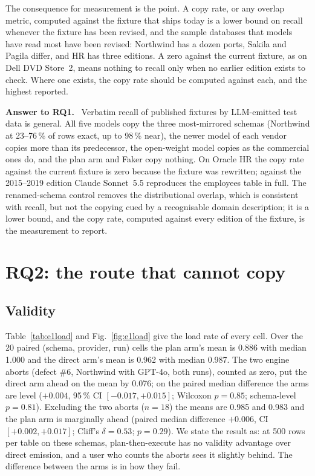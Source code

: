 \documentclass[preprint,12pt]{elsarticle}
\newenvironment{answer}[1]{\begin{framed}\noindent\textbf{#1.}\ }{\end{framed}}
\begin{document}
The consequence for measurement is the point. A copy rate, or any overlap metric, computed against the fixture that ships today is a lower bound on recall whenever the fixture has been revised, and the sample databases that models have read most have been revised: Northwind has a dozen ports, Sakila and Pagila differ, and HR has three editions. A zero against the current fixture, as on Dell DVD Store~2, means nothing to recall only when no earlier edition exists to check. Where one exists, the copy rate should be computed against each, and the highest reported.


\begin{answer}{Answer to RQ1}
Verbatim recall of published fixtures by LLM-emitted test data is general. All five models copy the three most-mirrored schemas (Northwind at 23--76\,\% of rows exact, up to 98\,\% near), the newer model of each vendor copies more than its predecessor, the open-weight model copies as the commercial ones do, and the plan arm and Faker copy nothing. On Oracle HR the copy rate against the current fixture is zero because the fixture was rewritten; against the 2015--2019 edition Claude Sonnet~5.5 reproduces the employees table in full. The renamed-schema control removes the distributional overlap, which is consistent with recall, but not the copying cued by a recognisable domain description; it is a lower bound, and the copy rate, computed against every edition of the fixture, is the measurement to report.
\end{answer}

\section{RQ2: the route that cannot copy}
\label{sec:rq2}

\subsection{Validity}
Table~\ref{tab:e1load} and Fig.~\ref{fig:e1load} give the load rate of every cell. Over the 20 paired (schema, provider, run) cells the plan arm's mean is 0.886 with median 1.000 and the direct arm's mean is 0.962 with median 0.987. The two engine aborts (defect \#6, Northwind with GPT-4o, both runs), counted as zero, put the direct arm ahead on the mean by 0.076; on the paired median difference the arms are level ($+0.004$, 95\,\% CI $[-0.017, +0.015]$; Wilcoxon $p=0.85$; schema-level $p=0.81$). Excluding the two aborts ($n=18$) the means are 0.985 and 0.983 and the plan arm is marginally ahead (paired median difference $+0.006$, CI $[+0.002, +0.017]$; Cliff's $\delta=0.53$; $p=0.29$). We state the result as: at 500 rows per table on these schemas, plan-then-execute has no validity advantage over direct emission, and a user who counts the aborts sees it slightly behind. The difference between the arms is in how they fail.
\end{document}
